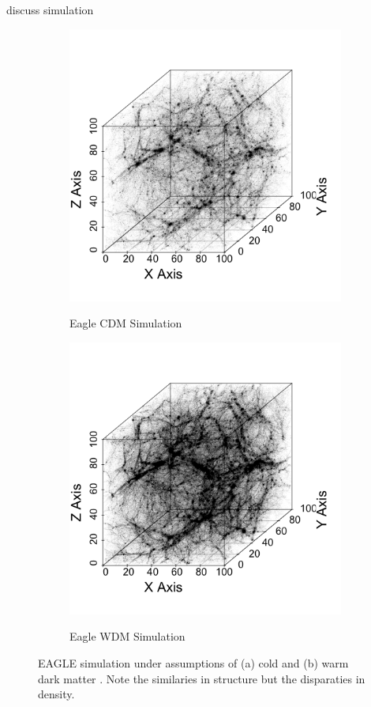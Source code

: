 \documentclass[12pt]{article}
\begin{document}
{\color{red} discuss simulation}
\begin{figure}[htp!]
  \centering
  \begin{subfigure}{.3\textwidth}
    \centering
    \caption{Eagle CDM Simulation}  \includegraphics[width=\linewidth]{figure_1_whole_wdm.png}
    \label{fig:introDataCDM}
  \end{subfigure}
    \begin{subfigure}{.3\textwidth}
    \centering
    \caption{Eagle WDM Simulation}  \includegraphics[width=\linewidth]{figure_1_whole_cdm.png}
    \label{fig:introDataWDM}
  \end{subfigure}
    \caption{EAGLE simulation under assumptions of (a) cold and (b) warm dark matter \citep{schaye2015eagle}. Note the similaries in structure but the disparaties in density. } 
    \label{fig:introData}
\end{figure}
\end{document}
